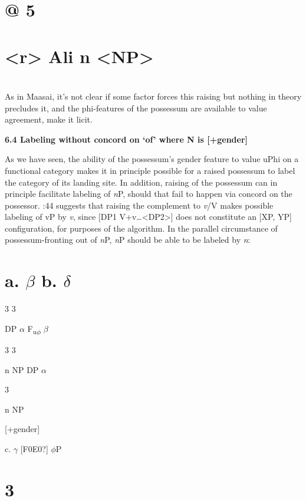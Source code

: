 \documentclass[output=paper
,modfonts
,nonflat]{langsci/langscibook}
\begin{document}
\section{                    @       5}
\section{                    <r> Ali        n              <NP>}
\section{\rmfamily} 

As in Maasai, it’s not clear if some factor forces this raising but nothing in theory precludes it, and the phi-features of the possessum are available to value agreement, make it licit.

\textbf{6.4  Labeling without concord on ‘of’ where N is [+gender]}

As we have seen, the ability of the possessum’s gender feature to value uPhi on a functional category makes it in principle possible for a raised possessum to label the category of its landing site. In addition, raising of the possessum can in principle facilitate labeling of \textit{n}P, should that fail to happen via concord on the possessor. \citealt{Chomsky2013}:44 suggests that raising the complement to \textit{v}/V makes possible labeling of vP by \textit{v}, since [DP1 V+v…<DP2>] does not constitute an [XP, YP] configuration, for purposes of the algorithm. In the parallel circumstance of possessum-fronting out of \textit{n}P, \textit{n}P should be able to be labeled by \textit{n}:

\section{ a.           ${\beta}$                  b.            ${\delta}$} 
\label{bkm:Ref515026065}
3        3

DP           ${\alpha}$         F\textsubscript{u}\textsubscript{${\phi}$}       ${\beta}$

3               3

n      NP                DP      ${\alpha}$

3

n          NP  

[+gender]

c.  ${\gamma}$      [F0E0?]     ${\phi}$P

\section{    3} 
\end{document}
